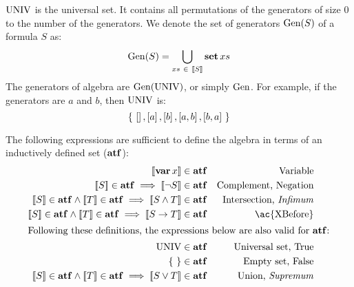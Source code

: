 $\operatorname{UNIV}$ is the universal set. 
It contains all permutations of the generators of size $0$ to the number of the generators.
%
We denote the set of generators $\mathrm{Gen}(S)$ of a formula $S$ as:
\begin{equation}
\mathrm{Gen}(S) = \bigcup_{xs ~\in~ \left[\!\left[S\right]\!\right]} \operatorname{\mathbf{set}} xs\label{eq:generators}
\end{equation}
%
The generators of \ac{algebra} are $\mathrm{Gen}(\operatorname{UNIV})$, or simply $\mathrm{Gen}$.
%
For example, if the generators are $a$ and $b$, then $\operatorname{UNIV}$ is:
%
\[
\left\{~ \left[  \right], \left[ a \right], \left[ b \right], \left[ a,b \right], \left[ b,a \right] ~\right\}
\]


The following expressions are sufficient to define the \ac{algebra} in terms of an inductively defined set ($\mathbf{atf}$):
%
\begin{subequations}
\label{def:algebraset}
\begin{align}
\denote{\var x} & \in \algebraset & \text{Variable}\label{def:algebraset-var}\\
\denote{S} \in \algebraset \implies \denote{\lnot S} & \in \algebraset & \text{Complement, Negation}\label{def:algebraset-compl}\\
\denote{S} \in \algebraset \land \denote{T} \in \algebraset \implies \denote{S \land T} & \in \algebraset & \text{Intersection, \emph{Infimum}}\label{def:algebraset-inf}\\
\denote{S} \in \algebraset \land \denote{T} \in \algebraset \implies \denote{\xbefore{S}{T}} & \in \algebraset & \text{\ac{XBefore}}\label{def:algebraset-xbefore}\\
\intertext{Following these definitions, the expressions below are also valid for $\algebraset$:}
\UNIV &\in \algebraset & \text{Universal set, True}\label{def:algebraset-true}\\
\emptyset &\in \algebraset & \text{Empty set, False}\label{def:algebraset-false}\\
\denote{S} \in \algebraset \land \denote{T} \in \algebraset \implies \denote{S \lor T} &\in \algebraset & \text{Union, \emph{Supremum}}\label{def:algebraset-sup}
\end{align}
\end{subequations}

